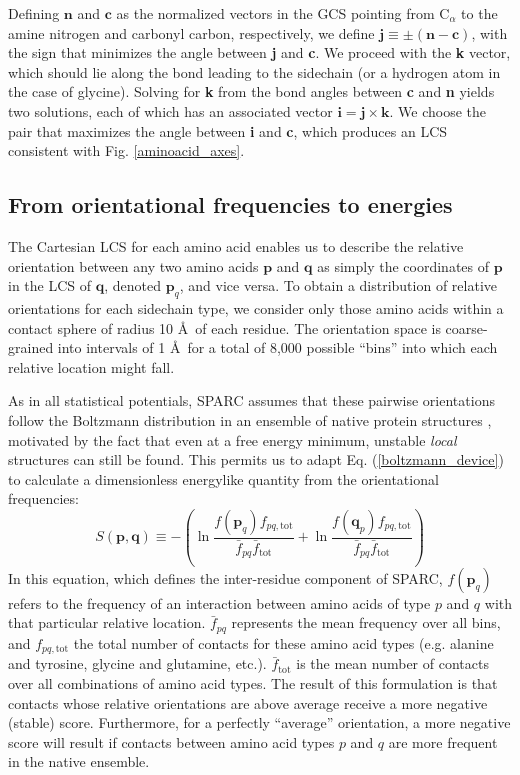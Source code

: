 \documentclass[11pt,twocolumn]{article}
\begin{document}
Defining $\textbf{n}$ and $\textbf{c}$ as the normalized vectors in the GCS pointing from C$_\alpha$ to the amine nitrogen and carbonyl carbon, respectively, we define $\textbf{j} \equiv \pm(\textbf{n} - \textbf{c})$, with the sign that minimizes the angle between \textbf{j} and \textbf{c}.
We proceed with the \textbf{k} vector, which should lie along the bond leading to the sidechain (or a hydrogen atom in the case of glycine).
Solving for \textbf{k} from the bond angles between \textbf{c} and \textbf{n} yields two solutions, each of which has an associated vector $\textbf{i}=\textbf{j}\times\textbf{k}$.
We choose the pair that maximizes the angle between \textbf{i} and \textbf{c}, which produces an LCS consistent with Fig. \ref{aminoacid_axes}.

\subsection{From orientational frequencies to energies}
The Cartesian LCS for each amino acid enables us to describe the relative orientation between any two amino acids $\textbf{p}$ and $\textbf{q}$ as simply the coordinates of $\textbf{p}$ in the LCS of $\textbf{q}$, denoted $\textbf{p}_q$, and vice versa.
To obtain a distribution of relative orientations for each sidechain type, we consider only those amino acids within a contact sphere of radius 10 \AA\, of each residue.
The orientation space is coarse-grained into intervals of 1 \AA\, for a total of 8,000 possible ``bins'' into which each relative location might fall.

As in all statistical potentials, SPARC assumes that these pairwise orientations follow the Boltzmann distribution in an ensemble of native protein structures \cite{sippl}, motivated by the fact that even at a free energy minimum, unstable \textit{local} structures can still be found.
This permits us to adapt Eq. (\ref{boltzmann_device}) to calculate a dimensionless energylike quantity from the orientational frequencies:
\begin{equation}
\displaystyle
S(\textbf{p}, \textbf{q}) \equiv -\left(\ln{\frac{f(\textbf{p}_q)f_{pq,\text{tot}}}{\bar{f}_{pq}\bar{f}_\text{tot}}} + \ln{\frac{f(\textbf{q}_p)f_{pq,\text{tot}}}{\bar{f}_{pq}\bar{f}_\text{tot}}}\right)
\label{sparc_equation}
\end{equation}
In this equation, which defines the inter-residue component of SPARC, $f(\textbf{p}_q)$ refers to the frequency of an interaction between amino acids of type $p$ and $q$ with that particular relative location. 
$\bar{f}_{pq}$ represents the mean frequency over all bins, and $f_{pq,\text{tot}}$ the total number of contacts for these amino acid types (e.g. alanine and tyrosine, glycine and glutamine, etc.).
$\bar{f}_\text{tot}$ is the mean number of contacts over all combinations of amino acid types.
The result of this formulation is that contacts whose relative orientations are above average receive a more negative (stable) score.
Furthermore, for a perfectly ``average'' orientation, a more negative score will result if contacts between amino acid types $p$ and $q$ are more frequent in the native ensemble.
\end{document}
